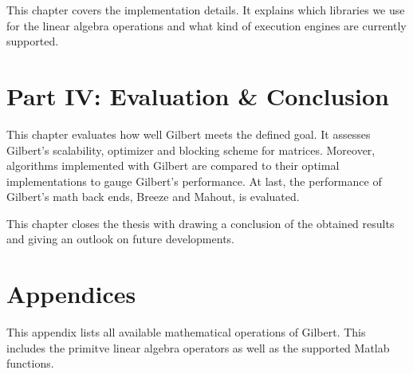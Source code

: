 \vspace{1mm}


\noindent This chapter covers the implementation details.
It explains which libraries we use for the linear algebra operations and what kind of execution engines are currently supported.

\vspace{1mm}

\section*{Part IV: Evaluation \& Conclusion}


This chapter evaluates how well Gilbert meets the defined goal.
It assesses Gilbert's scalability, optimizer and blocking scheme for matrices.
Moreover, algorithms implemented with Gilbert are compared to their optimal implementations to gauge Gilbert's performance.
At last, the performance of Gilbert's math back ends, Breeze and Mahout, is evaluated.

\vspace{1mm}


This chapter closes the thesis with drawing a conclusion of the obtained results and giving an outlook on future developments.

\vspace{1mm}

\section*{Appendices}


This appendix lists all available mathematical operations of Gilbert.
This includes the primitve linear algebra operators as well as the supported Matlab functions.